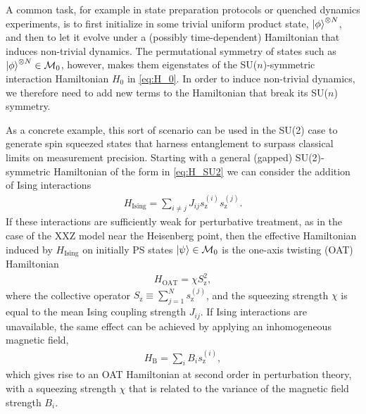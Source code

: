 \documentclass[nofootinbib,notitlepage,11pt]{revtex4-2}
\renewcommand{\t}{\text} %
\newcommand{\1}{\mathds{1}}
\newcommand{\z}{\text{z}}
\newcommand{\M}{\mathcal{M}}
\begin{document}
A common task, for example in state preparation protocols or quenched
dynamics experiments, is to first initialize in some trivial uniform
product state, $\ket\phi^{\otimes N}$, and then to let it evolve under
a (possibly time-dependent) Hamiltonian that induces non-trivial
dynamics.  The permutational symmetry of states such as
$\ket\phi^{\otimes N}\in\M_0$, however, makes them eigenstates of the
SU($n$)-symmetric interaction Hamiltonian $H_0$ in \eqref{eq:H_0}.  In
order to induce non-trivial dynamics, we therefore need to add new
terms to the Hamiltonian that break its SU($n$) symmetry.

As a concrete example, this sort of scenario can be used in the SU(2)
case to generate spin squeezed states that harness entanglement to
surpass classical limits on measurement
precision\cite{he2019engineering, perlin2020spin}.
Starting with a general (gapped) SU(2)-symmetric Hamiltonian of the
form in \eqref{eq:H_SU2} we can consider the addition of Ising
interactions
\begin{align}
  H_{\t{Ising}} = \sum_{i\ne j} J_{ij} s_\z^{(i)} s_\z^{(j)}.
  \label{eq:Ising}
\end{align}
If these interactions are sufficiently weak for perturbative
treatment, as in the case of the XXZ model near the Heisenberg point,
then the effective Hamiltonian induced by $H_{\t{Ising}}$ on initially
PS states $\ket\psi\in\M_0$ is the one-axis twisting (OAT)
Hamiltonian\cite{ma2011quantum}
\begin{align}
  H_{\t{OAT}} = \chi S_\z^2,
  \label{eq:OAT}
\end{align}
where the collective operator $S_\z\equiv\sum_{j=1}^Ns_\z^{(j)}$, and
the squeezing strength $\chi$ is equal to the mean Ising coupling
strength $J_{ij}$.  If Ising interactions are unavailable, the same
effect can be achieved by applying an inhomogeneous magnetic field,
\begin{align}
  H_{\t{B}} = \sum_i B_i s_\z^{(i)},
  \label{eq:magnetic}
\end{align}
which gives rise to an OAT Hamiltonian at second order in perturbation
theory, with a squeezing strength $\chi$ that is related to the
variance of the magnetic field strength $B_i$.
\end{document}

